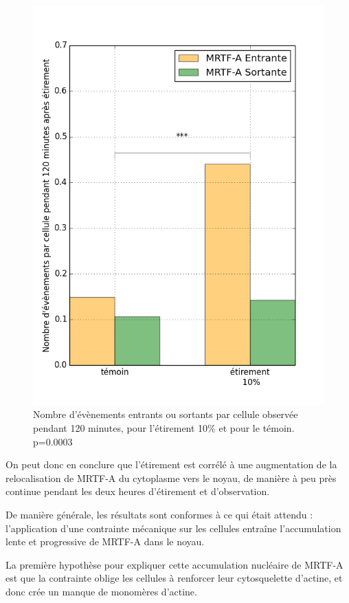 \begin{figure}
\includegraphics[scale=0.4]{Figures/Etirement10_vs_temoin_activite.png} 
\caption{\label{activite_Et10} Nombre d'évènements entrants ou sortants par cellule observée pendant 120 minutes, pour l'étirement 10\% et pour le témoin. p=0.0003 }
\end{figure}

On peut donc en conclure que l'étirement est corrélé à une augmentation de la relocalisation de MRTF-A du cytoplasme vers le noyau, de manière à peu près continue pendant les deux heures d'étirement et d'observation. 

De manière générale, les résultats sont conformes à ce qui était attendu : l'application d'une contrainte mécanique sur les cellules entraîne l'accumulation lente et progressive de MRTF-A dans le noyau. 

La première hypothèse pour expliquer cette accumulation nucléaire de MRTF-A est que la contrainte oblige les cellules à renforcer leur cytosquelette d'actine, et donc crée un manque de monomères d'actine.  

